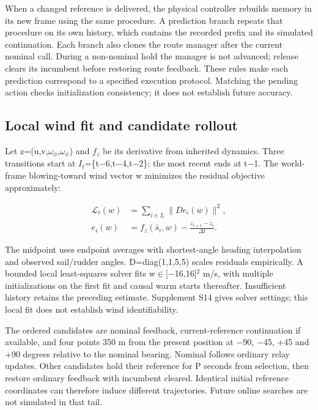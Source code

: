 \documentclass[conference]{IEEEtran}
\begin{document}
When a changed reference is delivered, the physical controller rebuilds memory in its new frame using the same procedure. A prediction branch repeats that procedure on its own history, which contains the recorded prefix and its simulated continuation. Each branch also clones the route manager after the current nominal call. During a non-nominal hold the manager is not advanced; release clears its incumbent before restoring route feedback. These rules make each prediction correspond to a specified execution protocol. Matching the pending action checks initialization consistency; it does not establish future accuracy.

\subsection{Local wind fit and candidate rollout}

Let z=(u,v,$\omega_\phi$,$\omega_\psi$) and $f_z$ be its derivative from inherited dynamics. Three transitions start at $I_t$=\{t\ensuremath{-}6,t\ensuremath{-}4,t\ensuremath{-}2\}; the most recent ends at t\ensuremath{-}1. The world-frame blowing-toward wind vector w minimizes the residual objective approximately:

\begin{equation}\label{eq:2}
\begin{aligned}\mathcal L_t(w)&=\sum_{i\in I_t}\|D e_i(w)\|^2,\\e_i(w)&=f_z(\bar s_i,w)-\frac{z_{i+1}-z_i}{\Delta t}.\end{aligned}
\end{equation}

The midpoint uses endpoint averages with shortest-angle heading interpolation and observed sail/rudder angles. D=diag(1,1,5,5) scales residuals empirically. A bounded local least-squares solver fits w\ensuremath{\in}[\ensuremath{-}16,16]\ensuremath{^2} m/s, with multiple initializations on the first fit and causal warm starts thereafter. Insufficient history retains the preceding estimate. Supplement S14 gives solver settings; this local fit does not establish wind identifiability.

The ordered candidates are nominal feedback, current-reference continuation if available, and four points 350 m from the present position at \ensuremath{-}90, \ensuremath{-}45, +45 and +90 degrees relative to the nominal bearing. Nominal follows ordinary relay updates. Other candidates hold their reference for P seconds from selection, then restore ordinary feedback with incumbent cleared. Identical initial reference coordinates can therefore induce different trajectories. Future online searches are not simulated in that tail.
\end{document}
